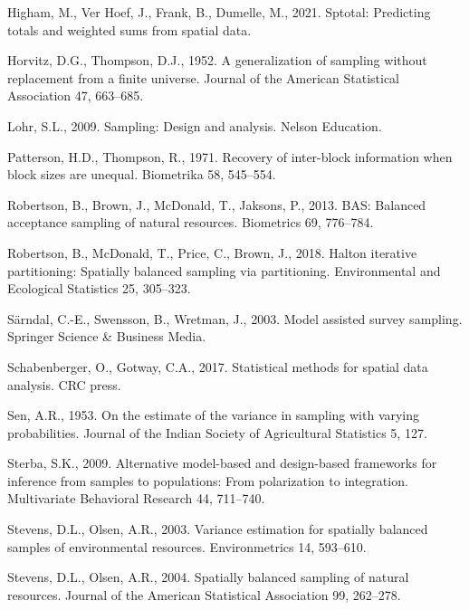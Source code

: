 \documentclass[]{elsarticle} %
\begin{document}
\leavevmode\hypertarget{ref-higham2021sptotal}{}%
Higham, M., Ver Hoef, J., Frank, B., Dumelle, M., 2021. Sptotal:
Predicting totals and weighted sums from spatial data.

\leavevmode\hypertarget{ref-horvitz1952generalization}{}%
Horvitz, D.G., Thompson, D.J., 1952. A generalization of sampling
without replacement from a finite universe. Journal of the American
Statistical Association 47, 663--685.

\leavevmode\hypertarget{ref-lohr2009sampling}{}%
Lohr, S.L., 2009. Sampling: Design and analysis. Nelson Education.

\leavevmode\hypertarget{ref-patterson1971recovery}{}%
Patterson, H.D., Thompson, R., 1971. Recovery of inter-block information
when block sizes are unequal. Biometrika 58, 545--554.

\leavevmode\hypertarget{ref-robertson2013bas}{}%
Robertson, B., Brown, J., McDonald, T., Jaksons, P., 2013. BAS: Balanced
acceptance sampling of natural resources. Biometrics 69, 776--784.

\leavevmode\hypertarget{ref-robertson2018halton}{}%
Robertson, B., McDonald, T., Price, C., Brown, J., 2018. Halton
iterative partitioning: Spatially balanced sampling via partitioning.
Environmental and Ecological Statistics 25, 305--323.

\leavevmode\hypertarget{ref-sarndal2003model}{}%
Särndal, C.-E., Swensson, B., Wretman, J., 2003. Model assisted survey
sampling. Springer Science \& Business Media.

\leavevmode\hypertarget{ref-schabenberger2017statistical}{}%
Schabenberger, O., Gotway, C.A., 2017. Statistical methods for spatial
data analysis. CRC press.

\leavevmode\hypertarget{ref-sen1953estimate}{}%
Sen, A.R., 1953. On the estimate of the variance in sampling with
varying probabilities. Journal of the Indian Society of Agricultural
Statistics 5, 127.

\leavevmode\hypertarget{ref-sterba2009alternative}{}%
Sterba, S.K., 2009. Alternative model-based and design-based frameworks
for inference from samples to populations: From polarization to
integration. Multivariate Behavioral Research 44, 711--740.

\leavevmode\hypertarget{ref-stevens2003variance}{}%
Stevens, D.L., Olsen, A.R., 2003. Variance estimation for spatially
balanced samples of environmental resources. Environmetrics 14,
593--610.

\leavevmode\hypertarget{ref-stevens2004spatially}{}%
Stevens, D.L., Olsen, A.R., 2004. Spatially balanced sampling of natural
resources. Journal of the American Statistical Association 99, 262--278.
\end{document}
